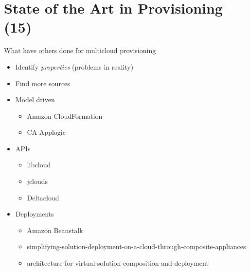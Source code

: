 \section{State of the Art in Provisioning (15)}

What have others done for multicloud provisioning

\begin{itemize}
  \item Identify \emph{properties} (problems in reality)
  \item Find more sources
  \item Model driven
    \begin{itemize}
      \item Amazon CloudFormation
      \item CA Applogic
    \end{itemize}
  \item APIs
    \begin{itemize}
      \item libcloud
      \item jclouds
      \item Deltacloud
    \end{itemize}
  \item Deployments
    \begin{itemize}
      \item Amazon Beanstalk
      \item simplifying-solution-deployment-on-a-cloud-through-composite-appliances
      \item architecture-for-virtual-solution-composition-and-deployment
    \end{itemize}
\end{itemize}
